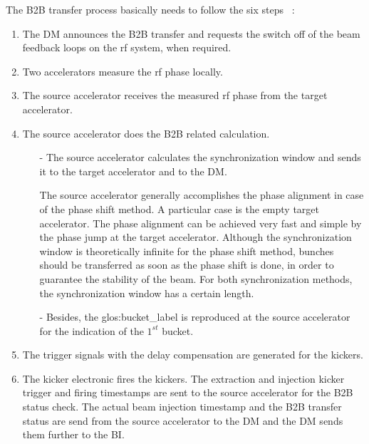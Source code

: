The B2B transfer process basically needs to follow the six steps ~\cite{bai_f-tc-c-05_2016}:
\begin{enumerate}
\item The DM announces the B2B transfer and requests the switch off of the beam feedback loops on the rf system, when required.
\item Two accelerators measure the rf phase locally.
\item The source accelerator receives the measured rf phase from the target accelerator.
\item The source accelerator does the B2B related calculation.
\begin{enumerate}
\item[-] The source accelerator calculates the synchronization window and sends it to the target accelerator and to the DM. 

The source accelerator generally accomplishes the phase alignment in case of the phase shift method. A particular case is the empty target accelerator. The phase alignment can be achieved very fast and simple by the phase jump at the target accelerator. Although the synchronization window is theoretically infinite for the phase shift method, bunches should be transferred as soon as the phase shift is done, in order to guarantee the stability of the beam. For both synchronization methods, the synchronization window has a certain length.

\item[-] Besides, the \gls{glos:bucket_label} is reproduced at the source accelerator for the indication of the $1^\mathit{st}$ bucket.
\end{enumerate}
\item The trigger signals with the delay compensation are generated for the kickers.
\item The kicker electronic fires the kickers. The extraction and injection kicker trigger and firing timestamps are sent to the source accelerator for the B2B status check. The actual beam injection timestamp and the B2B transfer status are send from the source accelerator to the DM and the DM sends them further to the BI.

\end{enumerate}



